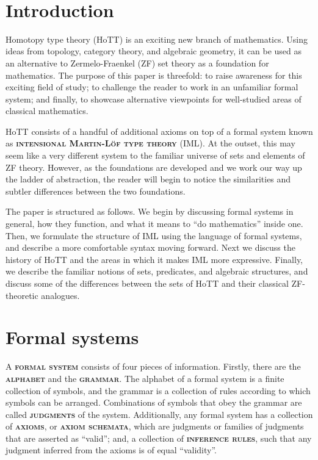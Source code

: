 \documentclass{article}
\newcommand{\defn}[1]{{\scshape\bfseries\color{MPBemph}#1}}
\newcommand{\doctitle}[4][black]
	{\begin{tcolorbox}[colback = white, colframe = #1, size = normal, rounded corners] \color{#1}
	\begin{center}\resizebox{\textwidth}{!}{\bfseries #2} \\[10pt]
	\resizebox{\textwidth - 2cm}{!}{#3~---~#4}
	\end{center}\end{tcolorbox}}
\newcommand{\1}{\textbf{1}}
\newcommand{\0}{\mathbf{0}}
\newcommand{\2}{\textbf{2}}
\begin{document}
\let\OD\displaystyle
\let\displaystyle\textstyle
\doctitle[MPBtitle]{Homotopy Type Theory}{Melanie Brown}{MATH 4905}
\section{Introduction}
Homotopy type theory (HoTT) is an exciting new branch of mathematics. Using ideas from topology, category theory, and algebraic geometry, it can be used as an alternative to Zermelo-Fraenkel (ZF) set theory as a foundation for mathematics. The purpose of this paper is threefold: to raise awareness for this exciting field of study; to challenge the reader to work in an unfamiliar formal system; and finally, to showcase alternative viewpoints for well-studied areas of classical mathematics.

HoTT consists of a handful of additional axioms on top of a formal system known as \defn{intensional Martin-L\"of type theory} (IML). At the outset, this may seem like a very different system to the familiar universe of sets and elements of ZF theory. However, as the foundations are developed and we work our way up the ladder of abstraction, the reader will begin to notice the similarities and subtler differences between the two foundations.

The paper is structured as follows. We begin by discussing formal systems in general, how they function, and what it means to ``do mathematics'' inside one. Then, we formulate the structure of IML using the language of formal systems, and describe a more comfortable syntax moving forward. Next we discuss the history of HoTT and the areas in which it makes IML more expressive. Finally, we describe the familiar notions of sets, predicates, and algebraic structures, and discuss some of the differences between the sets of HoTT and their classical ZF-theoretic analogues.
\section{Formal systems}
A \defn{formal system} consists of four pieces of information. Firstly, there are the \defn{alphabet} and the \defn{grammar}. The alphabet of a formal system is a finite collection of symbols, and the grammar is a collection of rules according to which symbols can be arranged. Combinations of symbols that obey the grammar are called \defn{judgments} of the system. Additionally, any formal system has a collection of \defn{axioms}, or \defn{axiom schemata}, which are judgments or families of judgments that are asserted as ``valid''; and, a collection of \defn{inference rules}, such that any judgment inferred from the axioms is of equal ``validity''.
\end{document}
